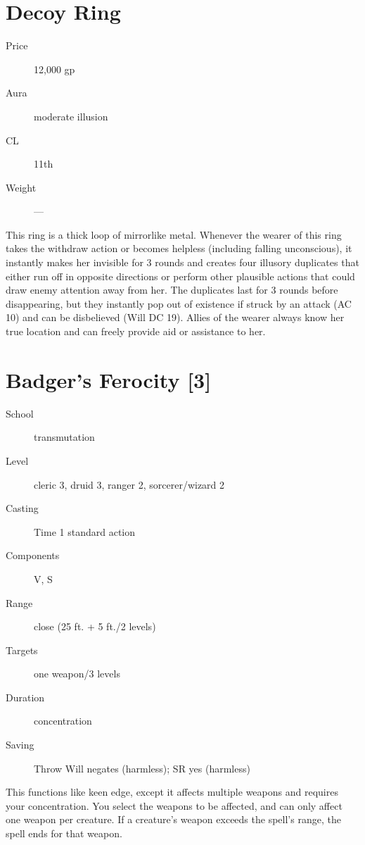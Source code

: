 \documentclass[english]{article}
\begin{document}
\section*{Decoy Ring}
\begin{description}
\item [{Price}] 12,000 gp
\item [{Aura}] moderate illusion
\item [{CL}] 11th
\item [{Weight}] —
\end{description}
This ring is a thick loop of mirrorlike metal. Whenever the wearer
of this ring takes the withdraw action or becomes helpless (including
falling unconscious), it instantly makes her invisible for 3 rounds
and creates four illusory duplicates that either run off in opposite
directions or perform other plausible actions that could draw enemy
attention away from her. The duplicates last for 3 rounds before disappearing,
but they instantly pop out of existence if struck by an attack (AC
10) and can be disbelieved (Will DC 19). Allies of the wearer always
know her true location and can freely provide aid or assistance to
her.


\section*{Badger's Ferocity {[}3{]}}
\begin{description}
\item [{School}] transmutation
\item [{Level}] cleric 3, druid 3, ranger 2, sorcerer/wizard 2
\item [{Casting}] Time 1 standard action
\item [{Components}] V, S
\item [{Range}] close (25 ft. + 5 ft./2 levels)
\item [{Targets}] one weapon/3 levels
\item [{Duration}] concentration
\item [{Saving}] Throw Will negates (harmless); SR yes (harmless)
\end{description}
This functions like keen edge, except it affects multiple weapons
and requires your concentration. You select the weapons to be affected,
and can only affect one weapon per creature. If a creature's weapon
exceeds the spell's range, the spell ends for that weapon.

\end{document}
